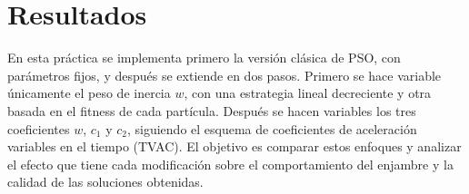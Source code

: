 
\usepackage{float}      %
\usepackage{booktabs}   %
\usepackage{multirow}   %
\usepackage{amsmath}    %
\usepackage{graphicx}   %


\section{Resultados}
\label{sec:resultados}





En esta práctica se implementa primero la versión clásica de PSO, con parámetros fijos, y después se extiende en dos pasos. Primero se hace variable únicamente el peso de inercia $w$, con una estrategia lineal decreciente y otra basada en el fitness de cada partícula. Después se hacen variables los tres coeficientes $w$, $c_1$ y $c_2$, siguiendo el esquema de coeficientes de aceleración variables en el tiempo (TVAC). El objetivo es comparar estos enfoques y analizar el efecto que tiene cada modificación sobre el comportamiento del enjambre y la calidad de las soluciones obtenidas.


